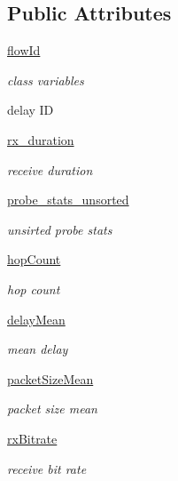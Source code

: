 \subsection*{Public Attributes}
\begin{DoxyCompactItemize}
\item 
\hyperlink{classflowmon-parse-results_1_1Flow_acaeb7a34b0ed25c4bfdfc7e497015e9f}{flow\+Id}
\begin{DoxyCompactList}\small\item\em class variables

delay ID \end{DoxyCompactList}\item 
\hyperlink{classflowmon-parse-results_1_1Flow_ab082f1677744e57e7e2cf7b23b589dc8}{rx\+\_\+duration}
\begin{DoxyCompactList}\small\item\em receive duration \end{DoxyCompactList}\item 
\hyperlink{classflowmon-parse-results_1_1Flow_ada58349bc1acdf422a8421e527030dc5}{probe\+\_\+stats\+\_\+unsorted}
\begin{DoxyCompactList}\small\item\em unsirted probe stats \end{DoxyCompactList}\item 
\hyperlink{classflowmon-parse-results_1_1Flow_accb8647fe9e2e8da4c7ff76fd77a5709}{hop\+Count}
\begin{DoxyCompactList}\small\item\em hop count \end{DoxyCompactList}\item 
\hyperlink{classflowmon-parse-results_1_1Flow_ac8365a583c4b8896bc96fac3d35f7cbe}{delay\+Mean}
\begin{DoxyCompactList}\small\item\em mean delay \end{DoxyCompactList}\item 
\hyperlink{classflowmon-parse-results_1_1Flow_a4989e2cc50c300a39cde6bb977e00e5f}{packet\+Size\+Mean}
\begin{DoxyCompactList}\small\item\em packet size mean \end{DoxyCompactList}\item 
\hyperlink{classflowmon-parse-results_1_1Flow_a5e0f7c959627122f01ba981c858d6c53}{rx\+Bitrate}
\begin{DoxyCompactList}\small\item\em receive bit rate \end{DoxyCompactList}\item 

\end{DoxyCompactItemize}
